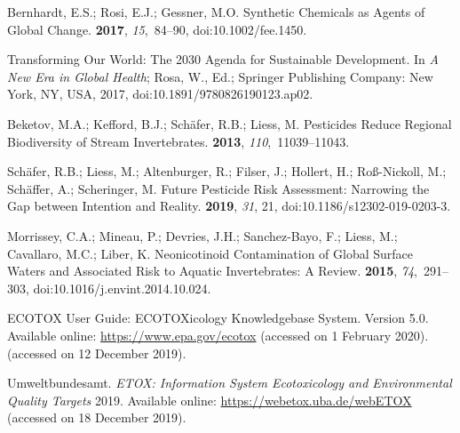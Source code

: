 \documentclass[data,datadescriptor,accept,moreauthors,pdftex]{Definitions/mdpi}
\begin{document}
\begin{thebibliography}{999}
Bernhardt, E.S.; Rosi, E.J.; Gessner, M.O.
\newblock Synthetic Chemicals as Agents of Global Change.
 {\bf 2017}, {\em
  15},~84--90, doi:10.1002/fee.1450.

Transforming {{Our World}}: {{The}} 2030 {{Agenda}} for {{Sustainable
  Development}}. In {\em A {{New Era}} in {{Global Health}}}; Rosa, W., Ed.;
  {Springer Publishing Company}: {New York, NY}, USA, 2017, doi:10.1891/9780826190123.ap02.

Beketov, M.A.; Kefford, B.J.; Sch{\"a}fer, R.B.; Liess, M.
\newblock Pesticides Reduce Regional Biodiversity of Stream Invertebrates.
 {\bf 2013},
  {\em 110},~11039--11043.

Sch{\"a}fer, R.B.; Liess, M.; Altenburger, R.; Filser, J.; Hollert, H.;
  {Ro{\ss}-Nickoll}, M.; Sch{\"a}ffer, A.; Scheringer, M.
\newblock Future Pesticide Risk Assessment: Narrowing the Gap between Intention
  and Reality.
 {\bf 2019}, {\em 31}, 21, doi:10.1186/s12302-019-0203-3.

Morrissey, C.A.; Mineau, P.; Devries, J.H.; {Sanchez-Bayo}, F.; Liess, M.;
  Cavallaro, M.C.; Liber, K.
\newblock Neonicotinoid Contamination of Global Surface Waters and Associated
  Risk to Aquatic Invertebrates: {{A}} Review.
 {\bf 2015}, {\em 74},~291--303, doi:10.1016/j.envint.2014.10.024.

ECOTOX User Guide: ECOTOXicology Knowledgebase
System. Version 5.0.
\newblock Available online: \url{https://www.epa.gov/ecotox} (accessed on 1 February 2020).
\newblock (accessed on 12 December 2019).

Umweltbundesamt.
\newblock \emph{{{ETOX}}: {{Information System Ecotoxicology}} and {{Environmental
  Quality Targets}}}  2019.
\newblock Available online: \url{https://webetox.uba.de/webETOX}
\newblock (accessed on 18 December 2019).


\end{thebibliography}
\end{document}

